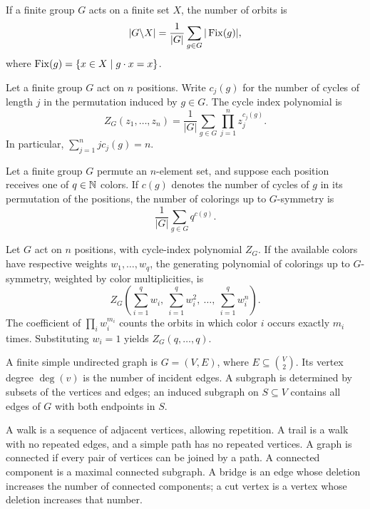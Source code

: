 \begin{theorem}
If a finite group $G$ acts on a finite set $X$, the number of orbits is
\[
 |G\backslash X|=\frac1{|G|}\sum_{g\in G}|\operatorname{Fix}(g)|,
\]
where $\operatorname{Fix}(g)=\{x\in X\mid g\cdot x=x\}$.
\end{theorem}

\begin{definition}
Let a finite group $G$ act on $n$ positions. Write $c_j(g)$ for the number of cycles of length $j$ in the permutation induced by $g\in G$. The cycle index polynomial is
\[
 Z_G(z_1,\dots,z_n)
 =\frac1{|G|}\sum_{g\in G}\prod_{j=1}^n z_j^{c_j(g)}.
\]
In particular, $\sum_{j=1}^n j c_j(g)=n$.
\end{definition}

\begin{theorem}
Let a finite group $G$ permute an $n$-element set, and suppose each position receives one of $q\in\mathbb{N}$ colors. If $c(g)$ denotes the number of cycles of $g$ in its permutation of the positions, the number of colorings up to $G$-symmetry is
\[
 \frac1{|G|}\sum_{g\in G}q^{c(g)}.
\]
\end{theorem}

\begin{proposition}
Let $G$ act on $n$ positions, with cycle-index polynomial $Z_G$. If the available colors have respective weights $w_1,\dots,w_q$, the generating polynomial of colorings up to $G$-symmetry, weighted by color multiplicities, is
\[
 Z_G\!\left(\sum_{i=1}^q w_i,\ \sum_{i=1}^q w_i^2,\ \dots,\ \sum_{i=1}^q w_i^n\right).
\]
The coefficient of $\prod_iw_i^{m_i}$ counts the orbits in which color $i$ occurs exactly $m_i$ times. Substituting $w_i=1$ yields $Z_G(q,\dots,q)$.
\end{proposition}

\begin{definition}
A finite simple undirected graph is $G=(V,E)$, where $E\subseteq\binom V2$. Its vertex degree $\deg(v)$ is the number of incident edges. A subgraph is determined by subsets of the vertices and edges; an induced subgraph on $S\subseteq V$ contains all edges of $G$ with both endpoints in $S$.
\end{definition}

\begin{definition}
A walk is a sequence of adjacent vertices, allowing repetition. A trail is a walk with no repeated edges, and a simple path has no repeated vertices. A graph is connected if every pair of vertices can be joined by a path. A connected component is a maximal connected subgraph. A bridge is an edge whose deletion increases the number of connected components; a cut vertex is a vertex whose deletion increases that number.
\end{definition}

